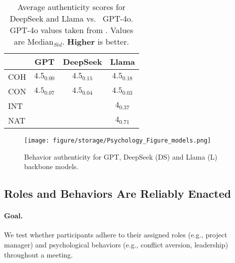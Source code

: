 \begin{table}[t]
    \centering
    \renewcommand{\arraystretch}{1.2} %
    \scriptsize
    \setlength{\tabcolsep}{3.8pt} %


    \begin{tabular}{lccc}
        \toprule
        \rowcolor{gray!20} %
        & \textbf{GPT} & \textbf{DeepSeek} & \textbf{Llama}\\
        \midrule
        COH 
            & $4.5_{\textit{0.00}}$
            & $4.5_{\textit{0.15}}$
            & $4.5_{\textit{0.18}}$ \\
        CON 
            & $4.5_{\textit{0.07}}$
            & $4.5_{\textit{0.04}}$
            & $4.5_{\textit{0.03}}$ \\
        INT 
            & \cellcolor{highlightGreen}{$\textbf{4.5}_{\textit{0.13}}$}
            & \cellcolor{highlightGreen}{$\textbf{4.5}_{\textit{0.94}}$}
            & $4_{\textit{0.37}}$ \\
        NAT 
            & \cellcolor{highlightGreen}{$\textbf{4.5}_{\textit{0.12}}$}
            & \cellcolor{highlightGreen}{$\textbf{4.5}_{\textit{0.84}}$}
            & $4_{\textit{0.71}}$\\
        \bottomrule
    \end{tabular}
    \caption{Average authenticity scores for DeepSeek and Llama vs. \ GPT-4o. GPT-4o values taken from . Values are Median$_{Std}$. \textbf{Higher} is better.}
    \label{tab:app_mid_size_models}
\end{table}

\begin{figure}[t!]
    \centering
    \texttt{[image: figure/storage/Psychology\_Figure\_models.png]}
    \caption{Behavior authenticity for GPT, DeepSeek (DS) and Llama (L) backbone models.}
    \label{fig:app_psychology2}
\end{figure}


\subsection{Roles and Behaviors Are Reliably Enacted}
\label{sec:app_roles_behaviors}

\paragraph{Goal.}
We test whether participants adhere to their assigned roles (e.g., project manager) and psychological behaviors (e.g., conflict aversion, leadership) throughout a meeting.

